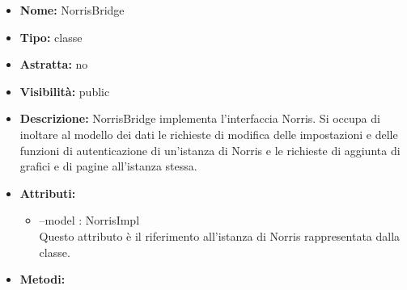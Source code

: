 			
			\begin{itemize}
			\item \textbf{Nome:} NorrisBridge
			\item \textbf{Tipo:} classe
			
		\item \textbf{Astratta:}
		no
			\item \textbf{Visibilità:} public
			\item \textbf{Descrizione:} NorrisBridge implementa l'interfaccia Norris. Si occupa di inoltare al modello dei dati le richieste di modifica delle impostazioni e delle funzioni di autenticazione di un'istanza di Norris e le richieste di aggiunta di grafici e di pagine all'istanza stessa.
			\item \textbf{Attributi:}
				\begin{itemize}
				\setlength{\itemsep}{5pt}
				
					\item[\ding{111}] {--model : NorrisImpl} \\ [1mm] Questo attributo è il riferimento all'istanza di Norris rappresentata dalla classe.
				\end{itemize}
		
			\item \textbf{Metodi:}
				\begin{itemize}
				\setlength{\itemsep}{5pt}
				

\end{itemize}
\end{itemize}
